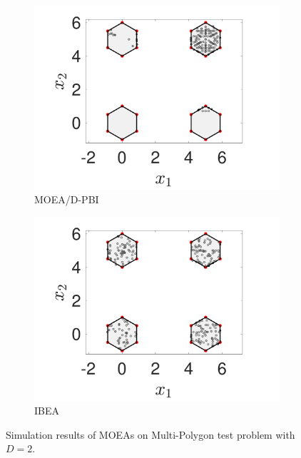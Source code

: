 \documentclass[conference]{IEEEtran}
\begin{document}
\begin{figure}[htbp]
    \begin{subfigure}[b]{.22\textwidth}
    \includegraphics[width=\linewidth]{Section5/dim2/PS/MOEAD_PBI}
    \caption{MOEA/D-PBI}
    \end{subfigure}
    \begin{subfigure}[b]{.22\textwidth}
    \includegraphics[width=\linewidth]{Section5/dim2/PS/IBEA}
    \caption{IBEA}
    \end{subfigure}

    \caption{Simulation results of MOEAs on Multi-Polygon test problem with $D=2$.}
    \label{fig: MOEAs PS dim=2}
\end{figure}
\end{document}
